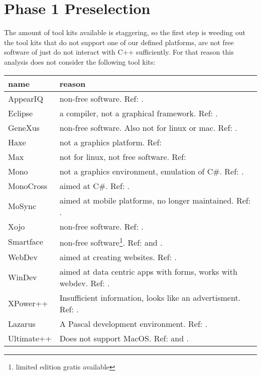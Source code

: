 \section{Phase 1 Preselection}

The amount of tool kits available is staggering, so the first step is weeding
out the tool kits that do not support one of our defined platforms, are not free
software of just do not interact with C++ sufficiently.  For that reason this
analysis does not consider the following tool kits:

\begin{center}
    \begin{tabular}{|p{7em}|p{25em}|}
	\hline
	{\bf name} & {\bf reason}\\\hline
	AppearIQ & non-free software. Ref: \cite{appear:appeariq}.\\
	Eclipse & a compiler, not a graphical framework. Ref: \cite{wiki:eclipse}.\\
	GeneXus & non-free software. Also not for linux
		    or mac. Ref: \cite{wiki:genexus}. \\
	Haxe & not a graphics platform. Ref: \cite{wiki:haxe}\\
	Max & not for linux, not free software. Ref: \cite{wiki:max}\\
	Mono & not a graphics environment, emulation
		of C\#. Ref: \cite{wiki:mono}.\\
	MonoCross & aimed at C\#. Ref: \cite{wiki:monocross}.\\
	MoSync & aimed at mobile platforms, no longer maintained. Ref: \cite{wiki:mosync}.\\
	Xojo & non-free software. Ref: \cite{wiki:xojo}.\\
	Smartface & non-free software\footnote{limited edition gratis available}. Ref: \cite{wiki:smartface} and \cite{smartface:license}.\\
	WebDev & aimed at creating websites. Ref: \cite{wiki:webdev}.\\
	WinDev & aimed at data centric apps with forms, works with webdev. Ref: \cite{wiki:windev}.\\
	XPower++ & Insufficient information, looks like an advertisment. Ref: \cite{wiki:xpower++}.\\
	Lazarus & A Pascal development environment. Ref: \cite{wiki:lazarus}.\\
	Ultimate++ & Does not support MacOS. Ref: \cite{wiki:ultimate++} and \cite{wxwidget:comparison}.\\
	\hline
    \end{tabular}
	\label{tab:discarded-toolkits}
\end{center}



